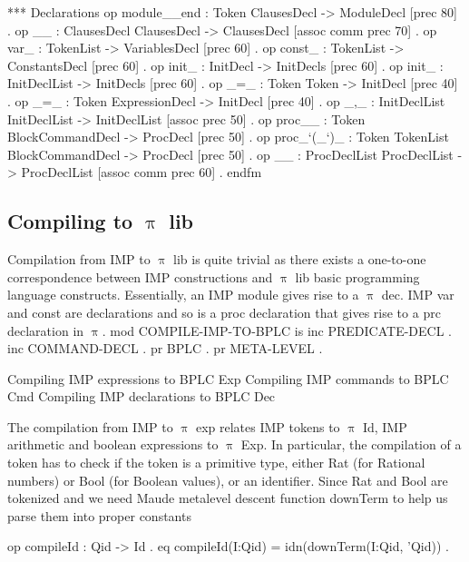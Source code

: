\documentclass[a4paper,openany]{book}
\begin{document}
 *** Declarations
 op module__end : Token ClausesDecl -> ModuleDecl [prec 80] .
 op __ : ClausesDecl ClausesDecl -> ClausesDecl [assoc comm prec 70] .
 op var_ : TokenList -> VariablesDecl [prec 60] .
 op const_ : TokenList -> ConstantsDecl [prec 60] .
 op init_ : InitDecl -> InitDecls [prec 60] .
 op init_ : InitDeclList -> InitDecls  [prec 60] .
 op _=_ : Token Token -> InitDecl  [prec 40] .
 op _=_ : Token ExpressionDecl -> InitDecl  [prec 40] .
 op _,_ : InitDeclList InitDeclList -> InitDeclList  [assoc prec 50] .
 op proc__ : Token BlockCommandDecl -> ProcDecl [prec 50] .
 op proc_`(_`)_ : Token TokenList BlockCommandDecl -> ProcDecl  
    [prec 50] .
 op __ : ProcDeclList ProcDeclList -> ProcDeclList  
   [assoc comm prec 60] .
endfm 
\nwendcode{}\nwdocspar

\subsection{Compiling to $\uppi$ lib}

Compilation from IMP to $\uppi$ lib is quite trivial as there exists a one-to-one correspondence between IMP constructions and $\uppi$ lib basic programming language constructs. Essentially, an IMP {\Tt{}module\nwendquote} gives rise to a $\uppi$ {\Tt{}dec\nwendquote}. IMP {\Tt{}var\nwendquote} and {\Tt{}const\nwendquote} are declarations and so is a {\Tt{}proc\nwendquote} declaration that gives rise to a {\Tt{}prc\nwendquote} declaration in $\uppi$. 
\nwenddocs{}\endmoddef\nwstartdeflinemarkup\nwenddeflinemarkup
mod COMPILE-IMP-TO-BPLC is
 inc PREDICATE-DECL .
 inc COMMAND-DECL .
 pr BPLC .
 pr META-LEVEL .

 \LA{}Compiling IMP expressions to BPLC Exp\RA{}
 \LA{}Compiling IMP commands to BPLC Cmd\RA{} 
 \LA{}Compiling IMP declarations to BPLC Dec\RA{}
\nwendcode{}\nwdocspar

The compilation from IMP to $\uppi$ exp relates IMP tokens to $\uppi$ Id, IMP arithmetic and boolean expressions to $\uppi$ Exp. In particular, the compilation of a {\Tt{}token\nwendquote} has to check if the token is a primitive type, either {\Tt{}Rat\nwendquote} (for Rational numbers) or {\Tt{}Bool\nwendquote} (for Boolean values), or an identifier. Since {\Tt{}Rat\nwendquote} and {\Tt{}Bool\nwendquote} are tokenized and we need Maude metalevel descent function {\Tt{}downTerm\nwendquote} to help us parse them into proper constants
 
\nwenddocs{}\endmoddef\nwstartdeflinemarkup\nwenddeflinemarkup
 op compileId : Qid -> Id .
 eq compileId(I:Qid) = idn(downTerm(I:Qid, 'Qid)) .
\end{document}

